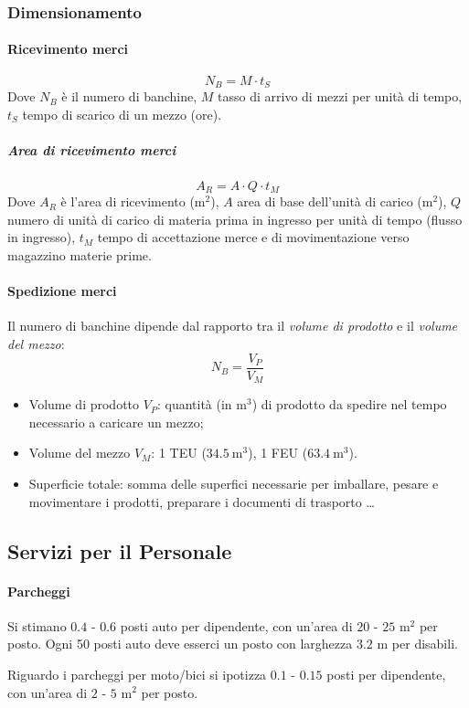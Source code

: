 %
\subsubsection{Dimensionamento}
%
\paragraph{Ricevimento merci}
\[
    N_{B} = M \cdot t_{S}
\]
Dove $ N_{B} $ è il numero di banchine, $ M $ tasso di arrivo di mezzi per unità di tempo, $ t_{S} $  tempo di scarico di un mezzo (ore).

%
\subparagraph{Area di ricevimento merci}
\[
    A_{R} = A \cdot Q \cdot t_{M}
\]
Dove $ A_{R} $ è l'area di ricevimento (m$ ^{2} $), $ A $ area di base dell'unità di carico (m$ ^{2} $), $ Q $ numero di unità di carico di materia prima in ingresso per unità di tempo (flusso in ingresso), $ t_{M} $ tempo di accettazione merce e di movimentazione verso magazzino materie prime.

%
\paragraph{Spedizione merci} Il numero di banchine dipende dal rapporto tra il \emph{volume di prodotto} e il \emph{volume del mezzo}:
\[
    N_{B} = \frac{V_{P}}{V_{M}}
\]
\begin{itemize}
    \item Volume di prodotto $ V_{P} $: quantità (in $ \text{m}^{3} $) di prodotto da spedire nel tempo necessario a caricare un mezzo;
    \item Volume del mezzo $ V_{M} $: 1 TEU ($ 34.5\ \text{m}^{3} $), 1 FEU ($ 63.4\ \text{m}^{3} $).
    \item Superficie totale: somma delle superfici necessarie per imballare, pesare e movimentare i prodotti, preparare i documenti di trasporto \dots
\end{itemize}
%
\subsection{Servizi per il Personale}
%
\paragraph{Parcheggi} Si stimano $0.4$ - $ 0.6 $ posti auto per dipendente, con un'area di $ 20 $ - $ 25 $ $\text{m}^2$ per posto.
Ogni 50 posti auto deve esserci un posto con larghezza $ 3.2 $ $ \text{m} $ per disabili.

Riguardo i parcheggi per moto/bici si ipotizza $ 0.1 $ - $ 0.15 $ posti per dipendente, con un'area di $ 2 $ - $ 5 $ $ \text{m}^2 $ per posto.

